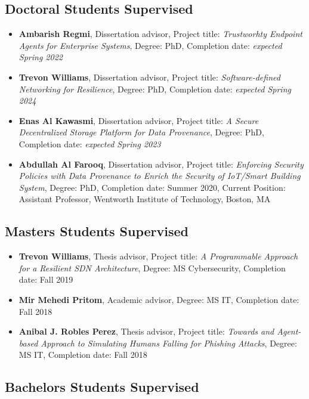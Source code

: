 
\hypertarget{phd-students}{%
\subsection{Doctoral Students Supervised}\label{phd-students}}

\begin{itemize}
\tightlist
\item \textbf{Ambarish Regmi}, Dissertation advisor, Project title: \textit{Trustworhty Endpoint Agents for Enterprise Systems}, Degree: PhD, Completion date: \textit{expected Spring 2022}
\item \textbf{Trevon Williams}, Dissertation advisor, Project title: \textit{Software-defined Networking for Resilience}, Degree: PhD, Completion date: \textit{expected Spring 2024}
\item \textbf{Enas Al Kawasmi}, Dissertation advisor, Project title: \textit{A Secure Decentralized Storage Platform for Data Provenance}, Degree: PhD, Completion date: \textit{expected Spring 2023}
\item \textbf{Abdullah Al Farooq}, Dissertation advisor, Project title: \textit{Enforcing Security Policies with Data Provenance to Enrich the Security of IoT/Smart Building System}, Degree: PhD, Completion date: Summer 2020, Current Position: Assistant Professor, Wentworth Institute of Technology, Boston, MA
\end{itemize}

\hypertarget{ms-students}{%
\subsection{Masters Students Supervised}\label{ms-students}}

\begin{itemize}
\tightlist
\item \textbf{Trevon Williams}, Thesis advisor, Project title: \textit{A Programmable Approach for a Resilient SDN Architecture}, Degree: MS Cybersecurity, Completion date: Fall 2019
\item \textbf{Mir Mehedi Pritom}, Academic advisor, Degree: MS IT, Completion date: Fall 2018
\item \textbf{Anibal J. Robles Perez}, Thesis advisor, Project title: \textit{Towards and Agent-based Approach to Simulating Humans Falling for Phishing Attacks}, Degree: MS IT, Completion date: Fall 2018
\end{itemize}

\hypertarget{bs-students}{%
\subsection{Bachelors Students Supervised}\label{bs-students}}

